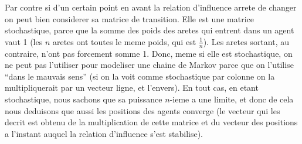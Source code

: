 \documentclass[a4paper,10pt]{report}
\begin{document}
Par contre si d'un certain point en avant la relation d'influence arrete de changer on peut bien considerer sa matrice de transition. Elle est une matrice stochastique, parce que la somme des poids des aretes qui entrent dans un agent vaut 1 (les $n$ aretes ont toutes le meme poids, qui est $\frac{1}{n}$). Les aretes sortant, au contraire, n'ont pas forcement somme 1. Donc, meme si elle est stochastique, on ne peut pas l'utiliser pour modeliser une chaine de Markov parce que on l'utilise ``dans le mauvais sens'' (si on la voit comme stochastique par colonne on la multipliquerait par un vecteur ligne, et l'envers). En tout cas, en etant stochastique, nous sachons que sa puissance $n$-ieme a une limite, et donc de cela nous deduisons que aussi les positions des agents converge (le vecteur qui les decrit est obtenu de la multiplication de cette matrice et du vecteur des positions a l'instant auquel la relation d'influence s'est stabilise).
\end{document}
